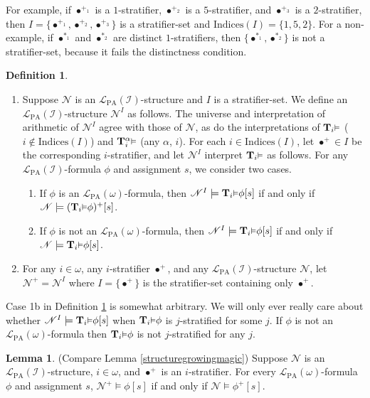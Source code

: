 \documentclass[reqno]{article}
\theoremstyle{definition}
\newtheorem{lemma}[theorem]{Lemma}
\newtheorem{definition}[theorem]{Definition}
\def\L{\mathscr{L}}
\def\T{\mathbf{T}}
\def\indices{\mathrm{Indices}}
\def\LPA{\L_{\mathrm{PA}}}
\def\indset{\mathcal I}
\renewcommand{\Pr}[1]{\T_{#1}\mbox{\small${\vDash}$}}
\newcommand{\Prr}[2]{\T^{#1}_{#2}\mbox{\small${\vDash}$}}
\begin{document}
For example, if $\bullet^{+_1}$ is a $1$-stratifier,
$\bullet^{+_2}$ is a $5$-stratifier, and $\bullet^{+_3}$ is a $2$-stratifier,
then $I=\{\bullet^{+_1},\bullet^{+_2},\bullet^{+_3}\}$ is a stratifier-set
and $\indices(I)=\{1,5,2\}$. For a non-example, if $\bullet^{*_1}$ and $\bullet^{*_2}$
are distinct $1$-stratifiers, then $\{\bullet^{*_1},\bullet^{*_2}\}$ is
not a stratifier-set, because it fails the distinctness condition.

\begin{definition}
\label{moduloidefn}
\item
\begin{enumerate}
\item
Suppose $\mathscr N$ is an $\LPA(\indset)$-structure
and $I$ is a stratifier-set.
We define an $\LPA(\indset)$-structure $\mathscr N^I$
as follows.
The universe and interpretation of arithmetic of $\mathscr N^I$
agree with those of $\mathscr N$,
as do the interpretations of $\Pr i$ ($i\not\in\indices(I)$)
and $\Prr\alpha i$ (any $\alpha$, $i$).
For each $i\in\indices(I)$, let $\bullet^+\in I$ be the corresponding
$i$-stratifier, and let $\mathscr N^I$ interpret $\Pr i$ as follows.
For any $\LPA(\indset)$-formula $\phi$ and assignment $s$,
we consider two cases.
\begin{enumerate}
  \item If $\phi$ is an $\LPA(\omega)$-formula, then
  $\mathscr N^I \models \Pr i\phi[s]$ if and only if $\mathscr N\models (\Pr i\phi)^+[s]$.
  \item If $\phi$ is not an $\LPA(\omega)$-formula, then
  $\mathscr N^I \models \Pr i\phi[s]$ if and only if $\mathscr N\models \Pr i\phi[s]$.
\end{enumerate}
\item
For any $i\in\omega$, any $i$-stratifier $\bullet^+$, and any
$\LPA(\indset)$-structure $\mathscr N$,
let $\mathscr N^+=\mathscr N^I$ where $I=\{\bullet^+\}$
is the stratifier-set containing only $\bullet^+$.
\end{enumerate}
\end{definition}

Case 1b in Definition \ref{moduloidefn} is somewhat arbitrary.
We will only ever really care about whether
$\mathscr N^I \models \Pr i\phi[s]$ when $\Pr i\phi$ is $j$-stratified for some $j$.
If $\phi$ is not an $\LPA(\omega)$-formula then $\Pr i\phi$ is not $j$-stratified for any $j$.

\begin{lemma}
\label{structurecollapsingmagic}
(Compare Lemma \ref{structuregrowingmagic})
Suppose $\mathscr N$ is an $\LPA(\indset)$-structure, $i\in\omega$, and $\bullet^+$
is an $i$-stratifier.
For every $\LPA(\omega)$-formula $\phi$ and assignment $s$,
$\mathscr N^+\models\phi[s]$ if and only if $\mathscr N\models\phi^+[s]$.
\end{lemma}
\end{document}

